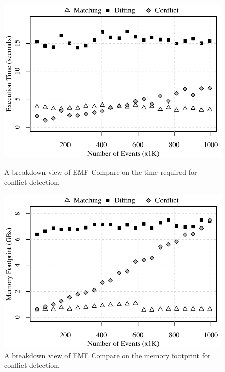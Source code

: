 \begin{figure}[]
\centering
\begin{minipage}[b]{0.490\textwidth}
	\includegraphics[width=\linewidth]{emfc-conflict-time-events}
	\caption{A breakdown view of EMF Compare on the time required for conflict detection.}
	\label{fig:emfc-conflict-time-events}
\end{minipage}
\hfill
\begin{minipage}[b]{0.490\textwidth}
	\includegraphics[width=\linewidth]{emfc-conflict-memory-events}
	\caption{A breakdown view of EMF Compare on the memory footprint for conflict detection.}
	\label{fig:emfc-conflict-memory-events}
\end{minipage}
\end{figure}

